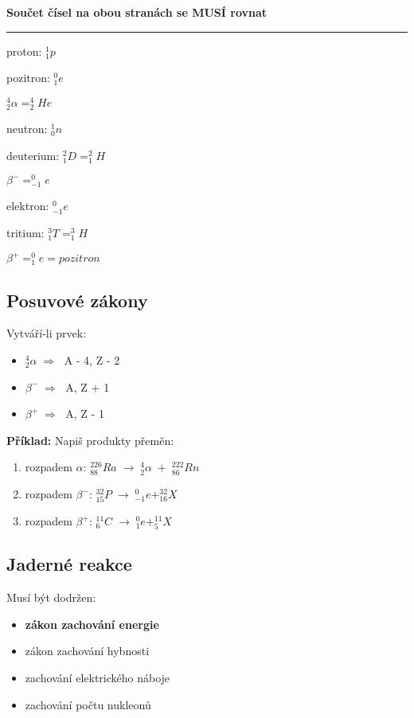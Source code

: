 \textbf{Součet čísel na obou stranách se MUSÍ rovnat}

\rule{44em}{1px}

\begin{multicols}{3}
    \vspace{0.5em}
    proton: $^1_1p$
    
    \vspace{0.5em}
    pozitron: $^0_1e$
    
    \vspace{0.5em}
    $^4_2\alpha = ^4_2He$
    
    \vspace{0.5em}
    neutron: $^1_0n$
    
    deuterium: $^2_1D = ^2_1H$
    
    $\beta^{-} = ^0_{-1}e$
    
    elektron: $^0_{-1}e$
    
    tritium: $^3_1T = ^3_1H$
    
    $\beta^{+} = ^0_1e = pozitron$
\end{multicols}

\subsection{Posuvové zákony}
Vytváří-li prvek:
\begin{itemize}
    \item $^4_2\alpha \; \Longrightarrow \;$ A - 4, Z - 2
    \item $\beta^- \; \Longrightarrow \;$ A, \;Z + 1
    \item $\beta^+ \; \Longrightarrow \;$ A, \;Z - 1
\end{itemize}
\textbf{Příklad:} Napiš produkty přeměn:
\begin{enumerate}
    \item rozpadem $\alpha$: \tab \(^{226}_{88}Ra \; \rightarrow \; ^4_2\alpha \; + \; ^{222}_{86}Rn\)
    \item rozpadem $\beta^-$: \tab \(^{32}_{15}P \; \rightarrow \; ^0_{-1}e + ^{32}_{16}X\)
    \item rozpadem $\beta^+$: \tab \(^{11}_{6}C \; \rightarrow \; ^0_{1}e + ^{11}_{5}X\)
\end{enumerate}

\subsection{Jaderné reakce}
Musí být dodržen:
\begin{itemize}
    \item \textbf{zákon zachování energie}
    \item zákon zachování hybnosti
    \item zachování elektrického náboje
    \item zachování počtu nukleonů
\end{itemize}

